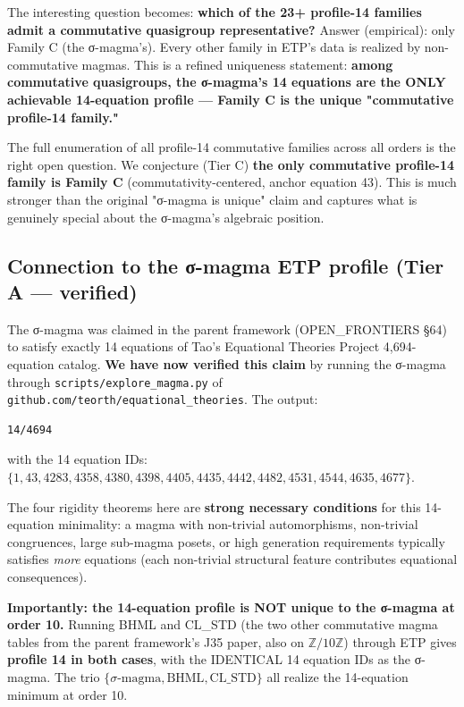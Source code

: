 \documentclass[11pt,reqno]{amsart}
\theoremstyle{plain}
\theoremstyle{definition}
\begin{document}
The interesting question becomes: \textbf{which of the 23+ profile-14 families admit a commutative quasigroup representative?} Answer (empirical): only Family C (the σ-magma's). Every other family in ETP's data is realized by non-commutative magmas. This is a refined uniqueness statement: \textbf{among commutative quasigroups, the σ-magma's 14 equations are the ONLY achievable 14-equation profile --- Family C is the unique "commutative profile-14 family."}

The full enumeration of all profile-14 commutative families across all orders is the right open question. We conjecture (Tier C) \textbf{the only commutative profile-14 family is Family C} (commutativity-centered, anchor equation 43). This is much stronger than the original "σ-magma is unique" claim and captures what is genuinely special about the σ-magma's algebraic position.

\subsection{Connection to the σ-magma ETP profile (Tier A --- verified)}

The σ-magma was claimed in the parent framework (OPEN_FRONTIERS §64) to satisfy exactly 14 equations of Tao's Equational Theories Project 4,694-equation catalog. \textbf{We have now verified this claim} by running the σ-magma through \texttt{scripts/explore_magma.py} of \texttt{github.com/teorth/equational_theories}. The output:

\begin{verbatim}
14/4694
\end{verbatim}

with the 14 equation IDs: $\{1, 43, 4283, 4358, 4380, 4398, 4405, 4435, 4442, 4482, 4531, 4544, 4635, 4677\}$.

The four rigidity theorems here are \textbf{strong necessary conditions} for this 14-equation minimality: a magma with non-trivial automorphisms, non-trivial congruences, large sub-magma posets, or high generation requirements typically satisfies \textit{more} equations (each non-trivial structural feature contributes equational consequences).

\textbf{Importantly: the 14-equation profile is NOT unique to the σ-magma at order 10.} Running BHML and CL_STD (the two other commutative magma tables from the parent framework's J35 paper, also on $\mathbb{Z}/10\mathbb{Z}$) through ETP gives \textbf{profile 14 in both cases}, with the IDENTICAL 14 equation IDs as the σ-magma. The trio $\{σ\text{-magma}, \text{BHML}, \text{CL\_STD}\}$ all realize the 14-equation minimum at order 10.
\end{document}
